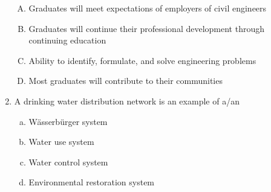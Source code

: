 \documentclass[11pt]{article}
\begin{document}
\begin{enumerate}
\begin{enumerate}[(A)]
\item Graduates will meet expectations of employers of civil engineers
\item Graduates will continue their professional development through continuing education
\item Ability to identify, formulate, and solve engineering problems
\item  Most graduates will contribute to their communities
\end{enumerate}
\item A drinking water distribution network is an example of a/an
\begin{enumerate}[(a)]
\item W{\"a}sserb{\"u}rger system
\item Water use system
\item Water control system
\item Environmental restoration system
\end{enumerate}
\end{enumerate}
\end{document}
